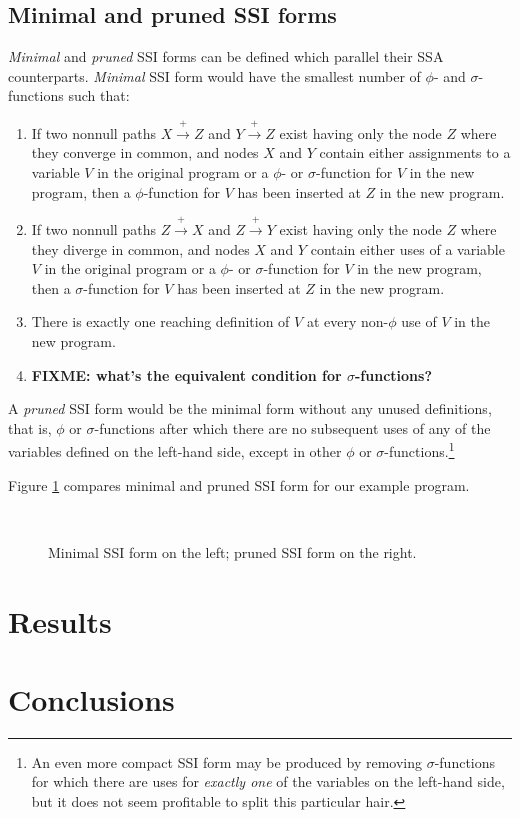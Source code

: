 \documentclass[12pt,notitlepage,twoside]{article}
\newcommand{\phifunction}{$\phi$-function}
\newcommand{\sigfunction}{$\sigma$-function}
\newcommand{\path}{\ensuremath{\rightarrow}}
\newcommand{\pathplus}{\ensuremath{\stackrel{+}{\path}}}
\begin{document}
\subsection{Minimal and pruned SSI forms}
\textit{Minimal} and \textit{pruned} SSI forms can be defined which
parallel their SSA counterparts.  \textit{Minimal} SSI form would have the
smallest number of $\phi$- and \sigfunction{s} such that:
\begin{enumerate}
\item If two nonnull paths $X \pathplus Z$ and $Y \pathplus Z$
exist having only the node $Z$ where they converge in common,
and nodes $X$ and $Y$ contain either assignments to a variable $V$ in the
original program or a $\phi$- or \sigfunction{} for $V$ in the new program,
then a \phifunction{} for $V$ has been inserted at $Z$ in the new program.
\item If two nonnull paths $Z \pathplus X$ and $Z \pathplus Y$
exist having only the node $Z$ where they diverge in common,
and nodes $X$ and $Y$ contain either uses of a variable $V$ in the
original program or a $\phi$- or \sigfunction{} for $V$ in the new program,
then a \sigfunction{} for $V$ has been inserted at $Z$ in the new program.
\item There is exactly one reaching definition of $V$ at every
non-$\phi$ use of $V$ in the new program.
\item \textbf{FIXME: what's the equivalent condition for \sigfunction{s}?}
\end{enumerate}

A \textit{pruned} SSI form would be the minimal form without any unused
definitions, that is, $\phi$ or \sigfunction{s} after which there are no
subsequent uses of any of the variables defined on the left-hand side,
except in other $\phi$ or \sigfunction{s}.\footnote{An even more
compact SSI form may be produced by removing \sigfunction{s} for which
there are uses for \textit{exactly one} of the variables on the
left-hand side, but it does not seem profitable to split this
particular hair.}

Figure \ref{fig:prunedssi} compares minimal and pruned SSI form for
our example program.
\begin{figure}\label{fig:prunedssi}
\begin{center}
 \vline\ 
\end{center}
\caption{Minimal SSI form on the left; pruned SSI form on the right.}
\end{figure}

\section{Results}
\section{Conclusions}


\appendix
\end{document}
